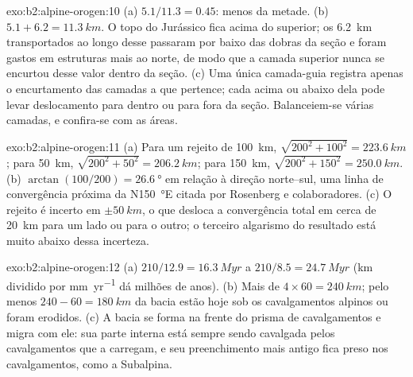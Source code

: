 \begin{solution}{exo:b2:alpine-orogen:10}
(a) $5.1/11.3 = 0.45$: menos da metade. (b) $5.1 + 6.2 = \qty{11.3}{km}$. O topo do
Jurássico fica acima do  superior; os \qty{6.2}{km} transportados ao longo desse 
passaram por baixo das dobras da seção e foram gastos em estruturas mais ao norte, de modo que a
camada superior nunca se encurtou desse valor dentro da seção. (c) Uma única camada-guia registra
apenas o encurtamento das camadas a que pertence; cada  acima ou abaixo dela pode
levar deslocamento para dentro ou para fora da seção. Balanceiem-se várias camadas, e confira-se com as áreas.
\end{solution}

\begin{solution}{exo:b2:alpine-orogen:11}
(a) Para um rejeito de \qty{100}{km}, $\sqrt{200^2 + 100^2} = \qty{223.6}{km}$; para
\qty{50}{km}, $\sqrt{200^2 + 50^2} = \qty{206.2}{km}$; para \qty{150}{km},
$\sqrt{200^2 + 150^2} = \qty{250.0}{km}$. (b) $\arctan(100/200) = \qty{26.6}{\degree}$ em relação à
direção norte--sul, uma linha de convergência próxima da N\qty{150}{\degree}E citada por Rosenberg e
colaboradores. (c) O rejeito é incerto em $\pm\qty{50}{km}$, o que desloca a convergência
total em cerca de \qty{20}{km} para um lado ou para o outro; o terceiro algarismo do resultado está muito abaixo
dessa incerteza.
\end{solution}

\begin{solution}{exo:b2:alpine-orogen:12}
(a) $210/12.9 = \qty{16.3}{Myr}$ a $210/8.5 = \qty{24.7}{Myr}$ (\unit{km} dividido por
\unit{mm.yr^{-1}} dá milhões de anos). (b) Mais de $4\times60 = \qty{240}{km}$; pelo
menos $240 - 60 = \qty{180}{km}$ da bacia estão hoje sob os cavalgamentos alpinos ou foram
erodidos. (c) A bacia se forma na frente do prisma de cavalgamentos e migra com ele: sua parte
interna está sempre sendo cavalgada pelos cavalgamentos que a carregam, e seu preenchimento mais antigo fica preso
nos cavalgamentos, como a  Subalpina.
\end{solution}

